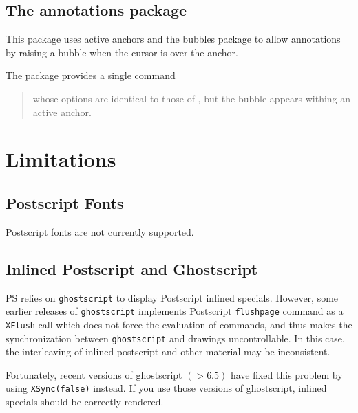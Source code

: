 \documentclass[12pt]{article}
\begin{document}
\medskip \noindent
\docdef \setkeys{}

\subsection{The annotations package}

This package uses active anchors and the bubbles package to 
allow annotations by raising a bubble when the cursor is over the anchor.

The package provides a single command

\medskip\noindent
\docdef \adviannot {}%
\begin{quote}
whose options are identical to those of \docdef \bubble, but the bubble
appears withing an active anchor. 
\end{quote}


\appendix

\section {Limitations}

\subsection*{Postscript Fonts}

Postscript fonts are not currently supported. 

\subsection*{Inlined Postscript and Ghostscript}

PS relies on {\tt ghostscript} to display Postscript inlined specials.
However, some earlier releases of {\tt ghostscript} 
implements Postscript {\tt flushpage} command as a {\tt XFlush} call
which does not force the evaluation of commands, and thus makes the 
synchronization between {\tt ghostscript} and {\ActiveDVI} drawings 
uncontrollable. In this case, the interleaving of inlined postscript 
and other material may be inconsistent. 

Fortunately, recent versions of ghostscript $(> 6.5)$ have
fixed this problem by using {\tt XSync(false)} instead.
If you use those versions of ghostscript, inlined specials should be
correctly rendered.
\end{document}
